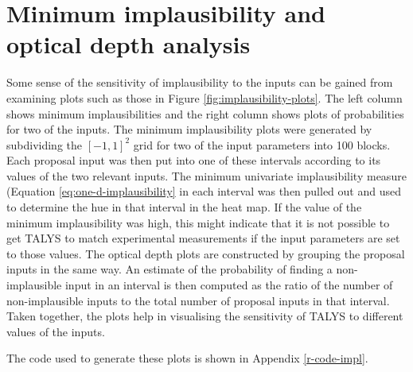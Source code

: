 \documentclass[
  12pt,
  a4paper,
  twoside]{book}
\begin{document}
\hypertarget{impl-optical-depth}{%
\section{Minimum implausibility and optical depth analysis}\label{impl-optical-depth}}

Some sense of the sensitivity of implausibility to the inputs can be gained from examining plots such as those in Figure \ref{fig:implausibility-plots}. The left column shows minimum implausibilities and the right column shows plots of probabilities for two of the inputs. The minimum implausibility plots were generated by subdividing the \([-1,1]^2\) grid for two of the input parameters into 100 blocks. Each proposal input was then put into one of these intervals according to its values of the two relevant inputs. The minimum univariate implausibility measure (Equation \eqref{eq:one-d-implausibility} in each interval was then pulled out and used to determine the hue in that interval in the heat map. If the value of the minimum implausibility was high, this might indicate that it is not possible to get TALYS to match experimental measurements if the input parameters are set to those values. The optical depth plots are constructed by grouping the proposal inputs in the same way. An estimate of the probability of finding a non-implausible input in an interval is then computed as the ratio of the number of non-implausible inputs to the total number of proposal inputs in that interval. Taken together, the plots help in visualising the sensitivity of TALYS to different values of the inputs.

The code used to generate these plots is shown in Appendix \ref{r-code-impl}.
\end{document}
